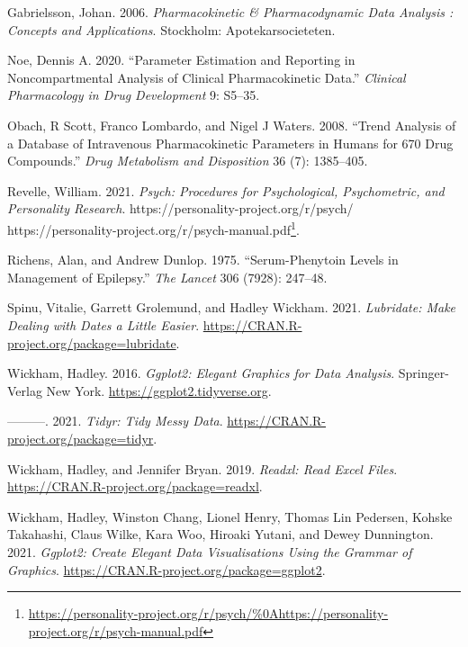 \documentclass[
  11pt,
  krantz2, a4paper, twoside]{krantz}
\newlength{\cslhangindent}
\newlength{\cslentryspacingunit} %
\newenvironment{CSLReferences}[2] %
 {%
  \setlength{\parindent}{0pt}
  \ifodd #1
  \let\oldpar\par
  \def\par{\hangindent=\cslhangindent\oldpar}
  \fi
  \setlength{\parskip}{#2\cslentryspacingunit}
 }%
 {}
\renewcommand{\href}[2]{#2\footnote{\url{#1}}}
\theoremstyle{definition}
\theoremstyle{definition}
\theoremstyle{definition}
\theoremstyle{definition}
\theoremstyle{remark}
\begin{document}
\begin{CSLReferences}{1}{0}
\leavevmode{}%
Gabrielsson, Johan. 2006. \emph{Pharmacokinetic \& Pharmacodynamic Data Analysis : Concepts and Applications}. Stockholm: Apotekarsocieteten.

\leavevmode{}%
Noe, Dennis A. 2020. {``Parameter Estimation and Reporting in Noncompartmental Analysis of Clinical Pharmacokinetic Data.''} \emph{Clinical Pharmacology in Drug Development} 9: S5--35.

\leavevmode{}%
Obach, R Scott, Franco Lombardo, and Nigel J Waters. 2008. {``Trend Analysis of a Database of Intravenous Pharmacokinetic Parameters in Humans for 670 Drug Compounds.''} \emph{Drug Metabolism and Disposition} 36 (7): 1385--405.

\leavevmode{}%
Revelle, William. 2021. \emph{Psych: Procedures for Psychological, Psychometric, and Personality Research}. \href{https://personality-project.org/r/psych/\%0Ahttps://personality-project.org/r/psych-manual.pdf}{https://personality-project.org/r/psych/
https://personality-project.org/r/psych-manual.pdf}.

\leavevmode{}%
Richens, Alan, and Andrew Dunlop. 1975. {``Serum-Phenytoin Levels in Management of Epilepsy.''} \emph{The Lancet} 306 (7928): 247--48.

\leavevmode{}%
Spinu, Vitalie, Garrett Grolemund, and Hadley Wickham. 2021. \emph{Lubridate: Make Dealing with Dates a Little Easier}. \url{https://CRAN.R-project.org/package=lubridate}.

\leavevmode{}%
Wickham, Hadley. 2016. \emph{Ggplot2: Elegant Graphics for Data Analysis}. Springer-Verlag New York. \url{https://ggplot2.tidyverse.org}.

\leavevmode{}%
---------. 2021. \emph{Tidyr: Tidy Messy Data}. \url{https://CRAN.R-project.org/package=tidyr}.

\leavevmode{}%
Wickham, Hadley, and Jennifer Bryan. 2019. \emph{Readxl: Read Excel Files}. \url{https://CRAN.R-project.org/package=readxl}.

\leavevmode{}%
Wickham, Hadley, Winston Chang, Lionel Henry, Thomas Lin Pedersen, Kohske Takahashi, Claus Wilke, Kara Woo, Hiroaki Yutani, and Dewey Dunnington. 2021. \emph{Ggplot2: Create Elegant Data Visualisations Using the Grammar of Graphics}. \url{https://CRAN.R-project.org/package=ggplot2}.


\end{CSLReferences}
\end{document}
